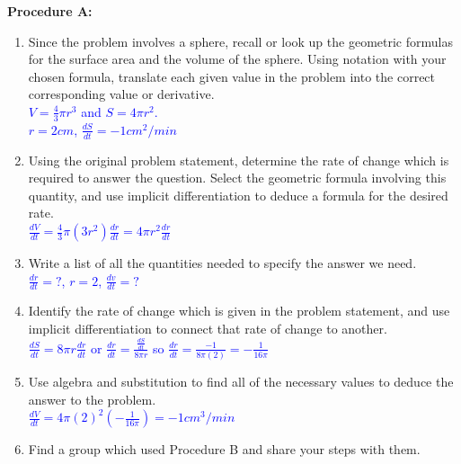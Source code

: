 \documentclass{ximera}
\begin{document}
\begin{exercise} \textbf{Procedure A:}
\begin{enumerate}
    \item Since the problem involves a sphere, recall or look up the geometric formulas for the surface area and the volume of the sphere.  Using notation with your chosen formula, translate each given value in the problem into the correct corresponding value or derivative.\\
     \textcolor{blue}{ $V=\frac{4}{3}\pi r^3$ and $S=4\pi r^2$.\\
     $r=2 cm$, $\frac{dS}{dt}=-1 cm^2/min$}
     
    \item Using the original problem statement, determine the rate of change which is required to answer the question.  Select the geometric formula involving this quantity, and use implicit differentiation to deduce a formula for the desired rate.\\
    \textcolor{blue}{ $\frac{dV}{dt}=\frac{4}{3}\pi(3r^2)\frac{dr}{dt}=4\pi r^2\frac{dr}{dt}$}
    \item Write a list of all the quantities needed to specify the answer we need.\\
    \textcolor{blue}{ $\frac{dr}{dt}=?$, $r=2$, $\frac{dv}{dt}=?$}
    \item Identify the rate of change which is given in the problem statement, and use implicit differentiation to connect that rate of change to another. \\
    \textcolor{blue}{ $\frac{dS}{dt}=8\pi r\frac{dr}{dt}$ or $\frac{dr}{dt}=\frac{\frac{dS}{dt}}{8\pi r}$ so $\frac{dr}{dt}=\frac{-1}{8\pi(2)}=-\frac{1}{16\pi}$}
    \item Use algebra and substitution to find all of the necessary values to deduce the answer to the problem. \\
    \textcolor{blue}{ $\frac{dV}{dt}=4\pi(2)^2(-\frac{1}{16\pi})=-1cm^3/min$}
    \item Find a group which used Procedure B and share your steps with them.
\end{enumerate}

\end{exercise}
\end{document}
